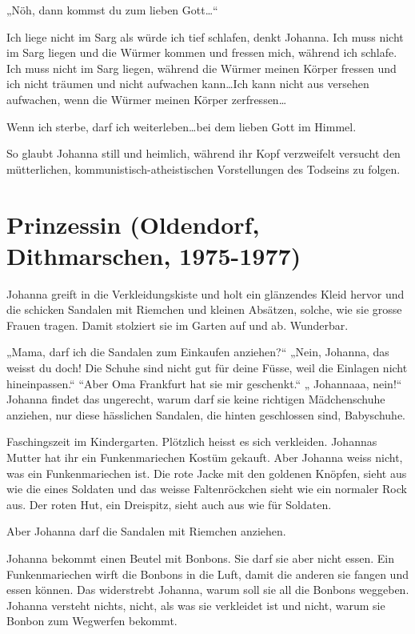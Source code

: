 „Nöh, dann kommst du zum lieben Gott\dots“

Ich liege nicht im Sarg als würde ich tief schlafen, denkt Johanna. Ich muss nicht im Sarg liegen und die Würmer kommen und fressen mich, während ich schlafe. Ich muss nicht im Sarg liegen, während die Würmer meinen Körper fressen und ich nicht träumen und nicht aufwachen kann\dots Ich kann nicht aus versehen aufwachen, wenn die Würmer meinen Körper zerfressen\dots

Wenn ich sterbe, darf ich weiterleben\dots bei dem lieben Gott im Himmel.

So glaubt Johanna still und heimlich, während ihr Kopf verzweifelt versucht den mütterlichen, kommunistisch-atheistischen Vorstellungen des Todseins zu folgen.


\section*{Prinzessin (Oldendorf, Dithmarschen, 1975-1977)}



Johanna greift in die Verkleidungskiste und holt ein glänzendes Kleid hervor und die schicken Sandalen mit Riemchen und kleinen Absätzen, solche, wie sie grosse Frauen tragen. Damit stolziert sie im Garten auf und ab.
 Wunderbar. 
 
 „Mama, darf  ich die Sandalen zum Einkaufen anziehen?“ „Nein, Johanna, das weisst du doch! Die Schuhe sind nicht gut für deine Füsse, weil die Einlagen nicht hineinpassen.“ “Aber Oma Frankfurt hat sie mir geschenkt.“ „ Johannaaa, nein!“ Johanna findet das ungerecht, warum darf sie keine richtigen Mädchenschuhe anziehen, nur diese hässlichen Sandalen, die hinten geschlossen sind, Babyschuhe.
 
Faschingszeit im Kindergarten. Plötzlich heisst es sich verkleiden. Johannas Mutter hat ihr ein Funkenmariechen Kostüm gekauft. Aber Johanna weiss nicht, was ein Funkenmariechen ist. Die rote Jacke mit den goldenen Knöpfen, sieht aus wie die eines Soldaten und das weisse Faltenröckchen sieht wie ein normaler Rock aus. Der roten Hut, ein Dreispitz, sieht auch aus wie für Soldaten. 

Aber Johanna darf die Sandalen mit Riemchen anziehen. 

Johanna bekommt einen Beutel mit Bonbons. Sie darf sie aber nicht essen. Ein Funkenmariechen wirft die Bonbons in die Luft, damit die anderen sie fangen und essen können. Das widerstrebt Johanna, warum soll sie all die Bonbons weggeben. Johanna versteht nichts, nicht, als was sie verkleidet ist und nicht, warum sie Bonbon zum Wegwerfen bekommt.

